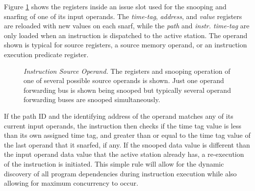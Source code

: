\documentclass[10pt,dvips]{article}
\begin{document}
Figure \ref{fig:source} shows the registers inside an 
issue slot used for the snooping and snarfing of 
one of its input operands.  
The 
{\em time-tag},
{\em address}, and
{\em value} registers are reloaded with new values on each snarf,
while the
{\em path} and
{\em instr. time-tag} are only loaded when an instruction is
dispatched to the active station.
The operand shown is typical for source registers, a source memory
operand, or an instruction execution predicate register.
%
\begin{figure}
\centering
{}
\caption{{\em Instruction Source Operand.} The registers and snooping
operation of one of several possible source operands is shown.
Just one operand forwarding bus is shown being snooped but
typically several operand forwarding buses are snooped simultaneously.}
\label{fig:source}
\end{figure}
%

If the
path ID and the identifying address of the operand matches any of
its current input operands, the instruction then checks
if the time tag value is less than its own assigned time tag,
and greater than or equal to the time tag value of the last
operand that it snarfed, if any.  
If the snooped data value is
different than the input operand data value that the active
station already has, a re-execution of the instruction is initiated.
This simple rule will allow for the dynamic discovery of
all program dependencies during instruction execution while 
also allowing for maximum concurrency to occur.
%
%
\end{document}
